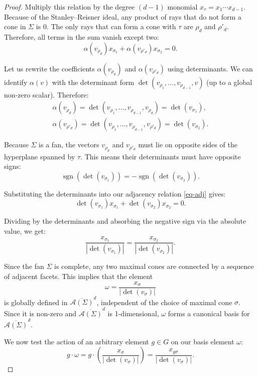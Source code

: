 \documentclass{amsart}
\theoremstyle{definition}
\theoremstyle{remark}
\numberwithin{equation}{section}
\begin{document}
\begin{proof}
Multiply this relation by the degree $(d-1)$ monomial $x_\tau = x_1 \cdots x_{d-1}$.
Because of the Stanley–Reisner ideal, any product of rays that do not form a cone in $\Sigma$ is $0$. The only rays that can form a cone with $\tau$ are $\rho_d$ and $\rho'_{d}$. Therefore, all terms in the sum vanish except two:
\begin{equation}\label{eq-adj}
 \alpha(v_{\rho_{d}}) x_{\sigma_1} + \alpha(v_{\rho'_{d}}) x_{\sigma_2} = 0.   
\end{equation}

Let us rewrite the coefficients $\alpha(v_{\rho_{d}})$ and $\alpha(v_{\rho'_{d}}) $ using determinants.
We can identify $\alpha(v)$ with the determinant form $\det(v_{\rho_1}, \dots, v_{\rho_{d-1}}, v)$ (up to a global non-zero scalar).
Therefore:
\begin{equation*}
 \begin{aligned}
  \alpha(v_{\rho_{d}}) = \det(v_{\rho_1}, \dots, v_{\rho_{d-1}}, v_{\rho_{d}}) = \det(v_{\sigma_1}),
\\
\alpha(v_{\rho'_{d}}) = \det(v_{\rho_1}, \dots, v_{\rho_{d-1}}, v_{\rho'_{d}}) = \det(v_{\sigma_2}).
 \end{aligned}   
\end{equation*}

Because $\Sigma$ is a fan, the vectors $v_{\rho_{d}}$ and $v_{\rho'_{d}}$ must lie on opposite sides of the hyperplane spanned by $\tau$. This means their determinants must have opposite signs:
$$ \operatorname{sgn}(\det(v_{\sigma_1})) = - \operatorname{sgn}(\det(v_{\sigma_2})). $$

Substituting the determinants into our adjacency relation \eqref{eq-adj} gives:
$$ \det(v_{\sigma_1}) x_{\sigma_1} + \det(v_{\sigma_2})x_{\sigma_2} = 0. $$

Dividing by the determinants and absorbing the negative sign via the absolute value, we get:
$$ \frac{x_{\sigma_1}}{|\det(v_{\sigma_1})|} = \frac{x_{\sigma_2}}{|\det(v_{\sigma_2})|}. $$

Since the fan $\Sigma$ is complete, any two maximal cones are connected by a sequence of adjacent facets. This implies that the element
$$ \omega = \frac{x_\sigma}{|\det(v_\sigma)|} $$
is globally defined in $\overline{\mathcal{A}(\Sigma)}^d$, independent of the choice of maximal cone $\sigma$. Since it is non-zero and $\overline{\mathcal{A}(\Sigma)}^d$ is 1-dimensional, $\omega$ forms a canonical basis for $\overline{\mathcal{A}(\Sigma)}^d$.

We now test the action of an arbitrary element $g \in G$ on our basis element $\omega$:
$$ g \cdot \omega = g \cdot \left( \frac{x_\sigma}{|\det(v_\sigma)|} \right) = \frac{x_{g\sigma}}{|\det(v_\sigma)|}.$$


\end{proof}
\end{document}
